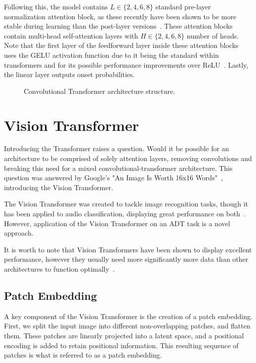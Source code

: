 Following this, the model contains $L \in \{2, 4, 6, 8\}$ standard pre-layer normalization attention block, as these recently have been shown to be more stable during learning than the post-layer versions~\cite{pmlr-v119-xiong20b}. These attention blocks contain multi-head self-attention layers with $H \in \{2, 4, 6, 8\}$ number of heads. Note that the first layer of the feedforward layer inside these attention blocks uses the \gls{GELU} activation function due to it being the standard within transformers and for its possible performance improvements over \gls{ReLU}~\cite{devlin-etal-2019-bert, hendrycks2023gaussianerrorlinearunits}. Lastly, the linear layer outputs onset probabilities.

\begin{figure}[H]
    \centering
    
    \caption{Convolutional Transformer architecture structure.}
    \label{CTFigure}
\end{figure}

\section{Vision Transformer}

Introducing the Transformer raises a question. Would it be possible for an architecture to be comprised of solely attention layers, removing convolutions and breaking this need for a mixed convolutional-transformer architecture. This question was answered by Google's "An Image Is Worth 16x16 Words"~\cite{dosovitskiy2021imageworth16x16words}, introducing the Vision Transformer.

The Vision Transformer was created to tackle image recognition tasks, though it has been applied to audio classification, displaying great performance on both~\cite{dosovitskiy2021imageworth16x16words, gong2021astaudiospectrogramtransformer}. However, application of the Vision Transformer on an \gls{ADT} task is a novel approach.

It is worth to note that Vision Transformers have been shown to display excellent performance, however they usually need more significantly more data than other architectures to function optimally~\cite{dosovitskiy2021imageworth16x16words}.

\subsection{Patch Embedding}

A key component of the Vision Transformer is the creation of a patch embedding. First, we split the input image into different non-overlapping patches, and flatten them. These patches are linearly projected into a latent space, and a positional encoding is added to retain positional information. This resulting sequence of patches is what is referred to as a patch embedding.

